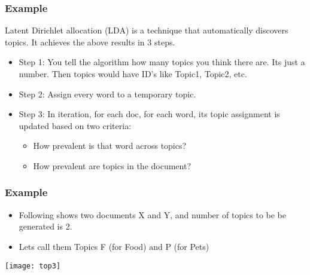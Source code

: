 \begin{frame}[fragile]\frametitle{Example}
Latent Dirichlet allocation (LDA) is a technique that automatically discovers topics. It achieves the above results in 3 steps. 


  \begin{itemize}
  	\item    Step 1: You tell the algorithm how many topics you think there are. Its just a number. Then topics would have ID's like Topic1, Topic2, etc.
  	\item    Step 2: Assign every word to a temporary topic.
	\item Step 3: In iteration, for each doc, for each word, its topic assignment is updated based on two criteria:
      \begin{itemize}
  	\item   How prevalent is that word across topics?
    	\item How prevalent are topics in the document?
  \end{itemize}
  \end{itemize}
\end{frame}

\begin{frame}[fragile]\frametitle{Example}
  \begin{itemize}
	\item Following shows two documents X and Y, and number of topics to be be generated is 2.
	\item Lets call them Topics F (for Food) and P (for Pets)
  \end{itemize}
	
\begin{center}
\texttt{[image: top3]}
\end{center}

\end{frame}


